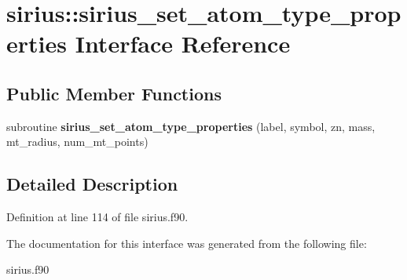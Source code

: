 \hypertarget{interfacesirius_1_1sirius__set__atom__type__properties}{}\section{sirius\+:\+:sirius\+\_\+set\+\_\+atom\+\_\+type\+\_\+properties Interface Reference}
\label{interfacesirius_1_1sirius__set__atom__type__properties}
\subsection*{Public Member Functions}
\begin{DoxyCompactItemize}
\item 
\hypertarget{interfacesirius_1_1sirius__set__atom__type__properties_acae5551c915fa4a18fad45154a58390e}{}subroutine {\bfseries sirius\+\_\+set\+\_\+atom\+\_\+type\+\_\+properties} (label, symbol, zn, mass, mt\+\_\+radius, num\+\_\+mt\+\_\+points)\label{interfacesirius_1_1sirius__set__atom__type__properties_acae5551c915fa4a18fad45154a58390e}

\end{DoxyCompactItemize}


\subsection{Detailed Description}


Definition at line 114 of file sirius.\+f90.



The documentation for this interface was generated from the following file\+:\begin{DoxyCompactItemize}
\item 
sirius.\+f90\end{DoxyCompactItemize}
